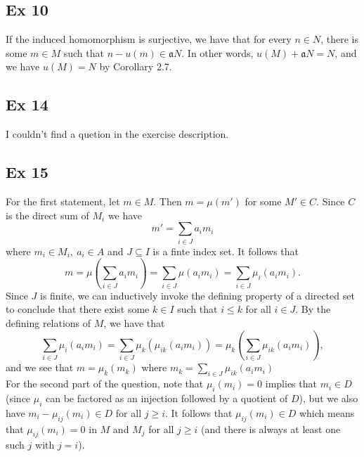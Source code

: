 \documentclass{article}
\theoremstyle{definition}
\begin{document}
\subsection*{Ex 10}

If the induced homomorphism is surjective, we have that for every $n \in N$,
there is some $m \in M$ such that $n - u(m) \in \mathfrak{a}N$. In other words,
$u(M) + \mathfrak{a}N = N$, and we have $u(M) = N$ by Corollary 2.7.

\subsection*{Ex 14}
I couldn't find a quetion in the exercise description.

\subsection*{Ex 15}
For the first statement, let $m \in M$. Then $m = \mu(m')$ for some $M' \in C$.
Since $C$ is the direct sum of $M_i$ we have
\[
	m' = \sum_{i \in J} a_i m_i
\] 
where $m_i \in M_i,\ a_i \in A$ and $J \subseteq I$ is a finte index set. It follows
that 
\[
	m 
	= 
	\mu\left(\sum_{i \in J} a_i m_i\right)
	= 
	\sum_{i \in J} \mu(a_i m_i)
	= 
	\sum_{i \in J} \mu_i(a_i m_i).
\] 
Since $J$ is finite, we can inductively invoke the defining property of a
directed set to conclude that there exist some $k \in I$ such that $i \leq k$
for all $i \in J$. By the defining relations of $M$, we have that 
\[
	\sum_{i \in J} \mu_i(a_i m_i) 
	=
	\sum_{i \in J} \mu_k( \mu_{ik}(a_i m_i) )
	=
	\mu_k\left(\sum_{i \in J}  \mu_{ik}(a_i m_i) \right),
\] 
and we see that $m = \mu_k(m_k)$ where $m_k = \sum_{i \in J}  \mu_{ik}(a_i
m_i)$ \\

For the second part of the question, note that $\mu_i(m_i) = 0$ implies that
$m_i \in D$ (since $\mu_i$ can be factored as an injection followed by a
quotient of $D$), but we also have $m_i - \mu_{ij}(m_i) \in D$ for all $j \geq
i$. It follows that $\mu_{ij}(m_i) \in D$ which means that $\mu_{ij}(m_i) = 0$
in $M$ and $M_j$ for all $j \geq i$ (and there is always at least one such $j$
with $j = i$). 
\end{document}
